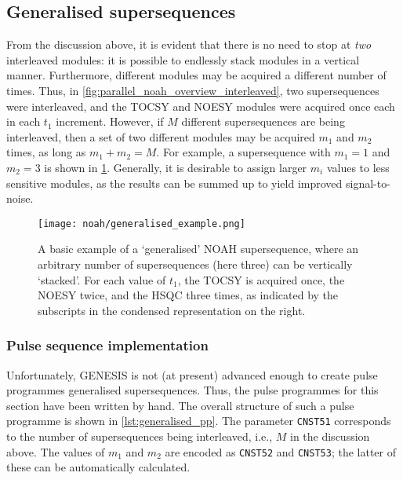 \subsection{Generalised supersequences}

From the discussion above, it is evident that there is no need to stop at \textit{two} interleaved modules: it is possible to endlessly stack modules in a vertical manner.
Furthermore, different modules may be acquired a different number of times.
Thus, in \cref{fig:parallel_noah_overview_interleaved}, two supersequences were interleaved, and the TOCSY and NOESY modules were acquired once each in each $t_1$ increment.
However, if $M$ different supersequences are being interleaved, then a set of two different modules may be acquired $m_1$ and $m_2$ times, as long as $m_1 + m_2 = M$.
For example, a supersequence with $m_1 = 1$ and $m_2 = 3$ is shown in \cref{fig:generalised_example}.
Generally, it is desirable to assign larger $m_i$ values to less sensitive modules, as the results can be summed up to yield improved signal-to-noise.

\begin{figure}[!ht]
    \centering
    \texttt{[image: noah/generalised\_example.png]}%
    \caption[A basic example of a generalised supersequence]{
        A basic example of a `generalised' NOAH supersequence, where an arbitrary number of supersequences (here three) can be vertically `stacked'.
        For each value of $t_1$, the TOCSY is acquired once, the NOESY twice, and the HSQC three times, as indicated by the subscripts in the condensed representation on the right.
    }
    \label{fig:generalised_example}
\end{figure}

\subsubsection{Pulse sequence implementation}

Unfortunately, GENESIS is not (at present) advanced enough to create pulse programmes generalised supersequences.
Thus, the pulse programmes for this section have been written by hand.
The overall structure of such a pulse programme is shown in \cref{lst:generalised_pp}.
The parameter \texttt{CNST51} corresponds to the number of supersequences being interleaved, i.e., $M$ in the discussion above.
The values of $m_1$ and $m_2$ are encoded as \texttt{CNST52} and \texttt{CNST53}; the latter of these can be automatically calculated.

